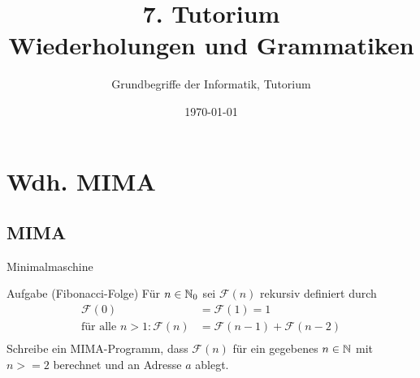 




\title[Grammatiken]{7. Tutorium\\ Wiederholungen und Grammatiken}
\subtitle{Grundbegriffe der Informatik, Tutorium \hashtag\mytutnumber}
\date{\today}


\titleframe
\roadmap

\section{Wdh. MIMA}
\subsection{MIMA}
\begin{frame}{Minimalmaschine}
	\begin{exampleblock}{Aufgabe (Fibonacci-Folge)}
		Für $n \in \mathbb{N}_0$ sei $\mathcal{F}(n)$ rekursiv definiert durch\\
		\begin{align*}
			 \mathcal{F}(0) &=  \mathcal{F}(1) = 1\\
			\text{für alle }n>1: \mathcal{F}(n) &= \mathcal{F}(n-1) + \mathcal{F}(n-2)\\
		\end{align*}
		Schreibe ein MIMA-Programm, dass $\mathcal{F}(n)$ für ein gegebenes $n \in \mathbb{N}$ mit $n>=2$ berechnet und an Adresse $a$ ablegt.
	\end{exampleblock}
\end{frame}
	
